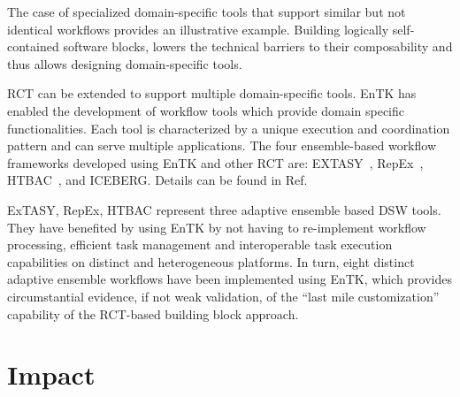 \documentclass[preprint,12pt, a4paper]{elsarticle}
\begin{document}
The case of specialized domain-specific tools that support similar but not
identical workflows provides an illustrative example. Building logically
self-contained software blocks, lowers the technical barriers to their
composability and thus allows designing domain-specific tools.

RCT can be extended to support multiple domain-specific tools. EnTK has
enabled the development of workflow tools which provide domain specific
functionalities. Each tool is characterized by a unique execution and
coordination pattern and can serve multiple applications. The four
ensemble-based workflow frameworks developed using EnTK and other RCT are:
EXTASY~\cite{balasubramanian2016extasy}, RepEx~\cite{treikalis2016repex},
HTBAC~\cite{dakka2018high}, and ICEBERG\@. Details can be found in
Ref.~\citep{turilli2019middleware}


ExTASY, RepEx, HTBAC represent three adaptive ensemble based DSW tools. They
have benefited by using EnTK by not having to re-implement workflow
processing, efficient task management and interoperable task execution
capabilities on distinct and heterogeneous platforms. In turn, eight distinct
adaptive ensemble workflows have been implemented using EnTK, which provides
circumstantial evidence, if not weak validation, of the ``last mile
customization'' capability of the RCT-based building block approach.

\section{Impact}\label{sec:impact}

\end{document}
